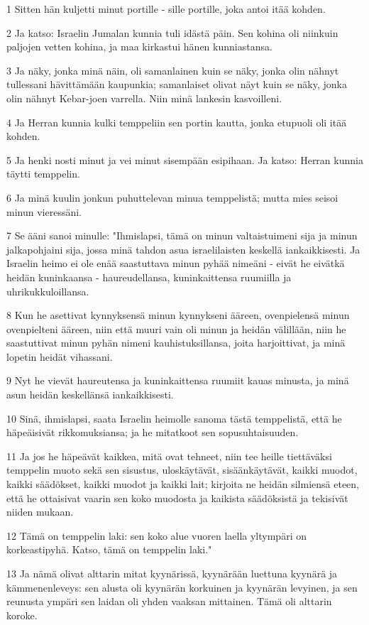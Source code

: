 \par 1 Sitten hän kuljetti minut portille - sille portille, joka antoi itää kohden.
\par 2 Ja katso: Israelin Jumalan kunnia tuli idästä päin. Sen kohina oli niinkuin paljojen vetten kohina, ja maa kirkastui hänen kunniastansa.
\par 3 Ja näky, jonka minä näin, oli samanlainen kuin se näky, jonka olin nähnyt tullessani hävittämään kaupunkia; samanlaiset olivat näyt kuin se näky, jonka olin nähnyt Kebar-joen varrella. Niin minä lankesin kasvoilleni.
\par 4 Ja Herran kunnia kulki temppeliin sen portin kautta, jonka etupuoli oli itää kohden.
\par 5 Ja henki nosti minut ja vei minut sisempään esipihaan. Ja katso: Herran kunnia täytti temppelin.
\par 6 Ja minä kuulin jonkun puhuttelevan minua temppelistä; mutta mies seisoi minun vieressäni.
\par 7 Se ääni sanoi minulle: "Ihmislapsi, tämä on minun valtaistuimeni sija ja minun jalkapohjaini sija, jossa minä tahdon asua israelilaisten keskellä iankaikkisesti. Ja Israelin heimo ei ole enää saastuttava minun pyhää nimeäni - eivät he eivätkä heidän kuninkaansa - haureudellansa, kuninkaittensa ruumiilla ja uhrikukkuloillansa.
\par 8 Kun he asettivat kynnyksensä minun kynnykseni ääreen, ovenpielensä minun ovenpielteni ääreen, niin että muuri vain oli minun ja heidän välillään, niin he saastuttivat minun pyhän nimeni kauhistuksillansa, joita harjoittivat, ja minä lopetin heidät vihassani.
\par 9 Nyt he vievät haureutensa ja kuninkaittensa ruumiit kauas minusta, ja minä asun heidän keskellänsä iankaikkisesti.
\par 10 Sinä, ihmislapsi, saata Israelin heimolle sanoma tästä temppelistä, että he häpeäisivät rikkomuksiansa; ja he mitatkoot sen sopusuhtaisuuden.
\par 11 Ja jos he häpeävät kaikkea, mitä ovat tehneet, niin tee heille tiettäväksi temppelin muoto sekä sen sisustus, uloskäytävät, sisäänkäytävät, kaikki muodot, kaikki säädökset, kaikki muodot ja kaikki lait; kirjoita ne heidän silmiensä eteen, että he ottaisivat vaarin sen koko muodosta ja kaikista säädöksistä ja tekisivät niiden mukaan.
\par 12 Tämä on temppelin laki: sen koko alue vuoren laella yltympäri on korkeastipyhä. Katso, tämä on temppelin laki."
\par 13 Ja nämä olivat alttarin mitat kyynärissä, kyynärään luettuna kyynärä ja kämmenenleveys: sen alusta oli kyynärän korkuinen ja kyynärän levyinen, ja sen reunusta ympäri sen laidan oli yhden vaaksan mittainen. Tämä oli alttarin koroke.
